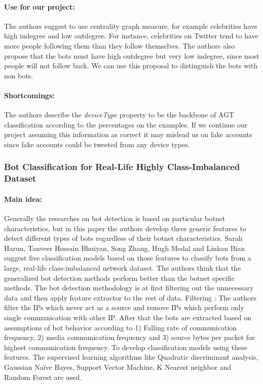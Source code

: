 \paragraph{Use for our project:}
The authors suggest to use centrality graph measure, for example celebrities have high indegree and low outdegree. For instance, celebrities on Twitter tend to have more people following them than they follow themselves. The authors also propose that the bots must have high outdegree but very low indegree, since most people will not follow back. We can use this proposal to distinguish the bots with non bots. ~\cite{cornelissen2018network} 
\paragraph{Shortcomings:}
 The authors describe the \emph{deviceType} property to be the backbone of AGT classification according to the percentages on the examples. If we continue our project assuming this information as correct it may mislead us on fake accounts since fake accounts could be tweeted from any device types.   




\subsubsection{Bot Classification for Real-Life Highly Class-Imbalanced Dataset}

\paragraph{Main idea:}
Generally the researches on bot detection is based on particular botnet characteristics, but in this paper the authors develop three generic features to detect different types of bots regardless of their botnet characteristics. Sarah Harun, Tanveer Hossain Bhuiyan, Song Zhang, Hugh Medal and Linkan Bian~\cite{harun2017bot} suggest five classification models based on those features to classify bots from a large, real-life class-imbalanced network dataset. The authors think that the generalized bot detection methods perform better than the botnet specific methods. 
The bot detection methodology is at first filtering out the unnecessary data and then apply feature extractor to the rest of data. Filtering : The authors filter the IPs which never act as a source and remove IPs which perform only single communication with other IP. After that the bots are extracted based on assumptions of bot behavior according to 1) Falling rate of communication frequency, 2) media communication frequency and 3) source bytes per packet for highest communication frequency.  To develop classification models using these features. The supervised learning algorithms like Quadratic discriminant analysis, Gaussian Naïve Bayes, Support Vector Machine, K Nearest neighbor and Random Forest are used. 
